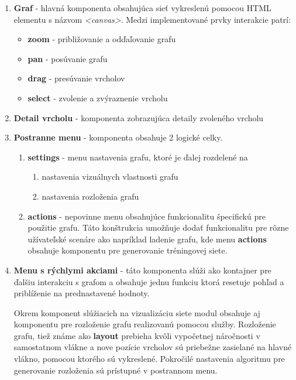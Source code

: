 \documentclass[slovak,master,dept460,male,cpp,cpdeclaration]{diploma}
\begin{document}
\begin{enumerate}
    \item \textbf{Graf} - hlavná komponenta obsahujúca sieť vykreslenú pomocou HTML elementu s názvom \textit{<canvas>}. Medzi implementované prvky interakcie patrí:
\begin{itemize}
\item \textbf{zoom} - približovanie a odďaľovanie grafu
\item \textbf{pan} - posúvanie grafu
\item \textbf{drag} - presúvanie vrcholov
\item \textbf{select} - zvolenie a zvýraznenie vrcholu
\end{itemize}
\item \textbf{Detail vrcholu} - komponenta zobrazujúca detaily zvoleného vrcholu
\item \textbf{Postranne menu} - komponenta obsahuje 2 logické celky.
    \begin{enumerate}
        \item \textbf{settings} - menu nastavenia grafu, ktoré je ďalej rozdelené na 
        \begin{enumerate}
            \item nastavenia vizuálnych vlastnosti grafu
            \item nastavenia rozloženia grafu 
        \end{enumerate}
        \item \textbf{actions} - nepovinne menu obsahujúce funkcionalitu špecifickú pre použitie grafu. Táto konštrukcia umožňuje dodať funkcionalitu pre rôzne užívateľské scenáre ako napríklad ladenie grafu, kde menu \textbf{actions} obsahuje komponentu pre generovanie tréningovej siete.
    \end{enumerate}
\item \textbf{Menu s rýchlymi akciami} - táto komponenta slúži ako kontajner pre ďalšiu interakciu s grafom a obsahuje jednu funkciu ktorá resetuje pohľad a priblíženie na prednastavené hodnoty. 

Okrem komponent slúžiacich na vizualizáciu siete modul obsahuje  aj komponentu pre rozloženie grafu realizovanú pomocou služby. Rozloženie grafu, tiež známe ako \textbf{layout} prebieha kvôli vypočetnej náročnosti v samostatnom vlákne a nove pozície vrcholov sú priebežne zasielané na hlavné vlákno, pomocou ktorého sú vykreslené. Pokročilé nastavenia algoritmu pre generovanie rozloženia sú prístupné v postrannom menu.
\end{enumerate}
\end{document}
